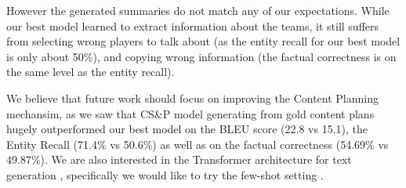 However the generated summaries do not match any of our expectations. While our best model learned to extract information about the teams, it still suffers from selecting wrong players to talk about (as the entity recall for our best model is only about 50\%), and copying wrong information (the factual correctness is on the same level as the entity recall).

We believe that future work should focus on improving the Content Planning mechansim, as we saw that CS\&P model generating from gold content plans hugely outperformed our best model on the BLEU score (22.8 vs 15.1), the Entity Recall (71.4\% vs 50.6\%) as well as on the factual correctness (54.69\% vs 49.87\%). We are also interested in the Transformer architecture for text generation \citep{vaswani2017attention}, specifically we would like to try the few-shot setting \citep{chen2020fewshot}.